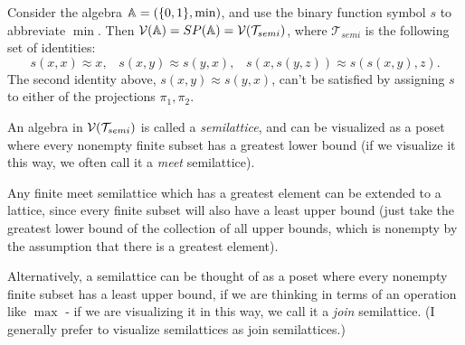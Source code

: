 \documentclass[letterpaper,11pt]{article}
\begin{document}
\begin{ex} Consider the algebra $\mathbb{A} = (\{0,1\}, \min)$, and use the binary function symbol $s$ to abbreviate $\min$. Then $\mathcal{V}(\mathbb{A}) = SP(\mathbb{A}) = \mathcal{V}(\mathcal{T}_{semi})$, where $\mathcal{T}_{semi}$ is the following set of identities:
\[
s(x,x) \approx x, \;\;\; s(x,y) \approx s(y,x), \;\;\; s(x,s(y,z)) \approx s(s(x,y),z).
\]
The second identity above, $s(x,y) \approx s(y,x)$, can't be satisfied by assigning $s$ to either of the projections $\pi_1, \pi_2$.

An algebra in $\mathcal{V}(\mathcal{T}_{semi})$ is called a \emph{semilattice}, and can be visualized as a poset where every nonempty finite subset has a greatest lower bound (if we visualize it this way, we often call it a \emph{meet} semilattice).

Any finite meet semilattice which has a greatest element can be extended to a lattice, since every finite subset will also have a least upper bound (just take the greatest lower bound of the collection of all upper bounds, which is nonempty by the assumption that there is a greatest element).

Alternatively, a semilattice can be thought of as a poset where every nonempty finite subset has a least upper bound, if we are thinking in terms of an operation like $\max$ - if we are visualizing it in this way, we call it a \emph{join} semilattice. (I generally prefer to visualize semilattices as join semilattices.)
\end{ex}
\end{document}
